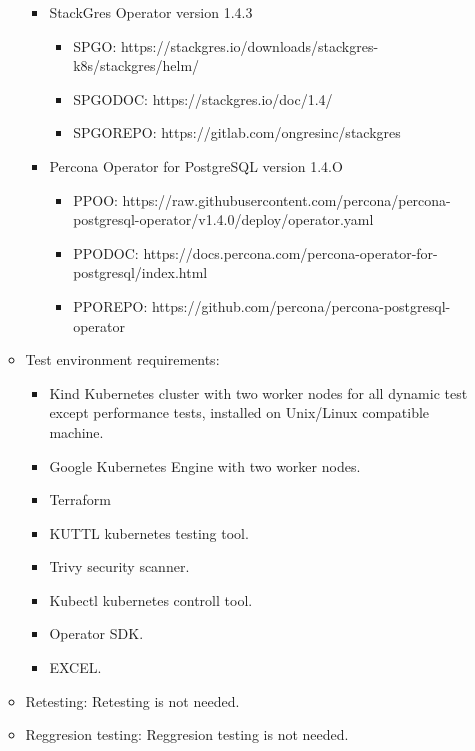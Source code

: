 \begin{itemize}
\begin{itemize}
\begin{itemize}
                  \item StackGres Operator version 1.4.3
                        \begin{itemize}
                          \item SPGO: https://stackgres.io/downloads/stackgres-k8s/stackgres/helm/
                          \item SPGODOC: https://stackgres.io/doc/1.4/
                          \item SPGOREPO: https://gitlab.com/ongresinc/stackgres
                        \end{itemize}
                  \item Percona Operator for PostgreSQL version 1.4.O
                        \begin{itemize}
                          \item PPOO: https://raw.githubusercontent.com/percona/percona-postgresql-operator/v1.4.0/deploy/operator.yaml
                          \item PPODOC: https://docs.percona.com/percona-operator-for-postgresql/index.html
                          \item PPOREPO: https://github.com/percona/percona-postgresql-operator
                        \end{itemize}
                \end{itemize}
          \item Test environment requirements:
                \begin{itemize}
                  \item Kind Kubernetes cluster with two worker nodes for all dynamic test except performance tests, installed on Unix/Linux compatible machine.
                  \item Google Kubernetes Engine with two worker nodes.
                  \item Terraform
                  \item KUTTL kubernetes testing tool.
                  \item Trivy security scanner.
                  \item Kubectl kubernetes controll tool.
                  \item Operator SDK.
                  \item EXCEL.
                \end{itemize}
          \item Retesting: Retesting is not needed.
          \item Reggresion testing: Reggresion testing is not needed.

\end{itemize}
\end{itemize}
